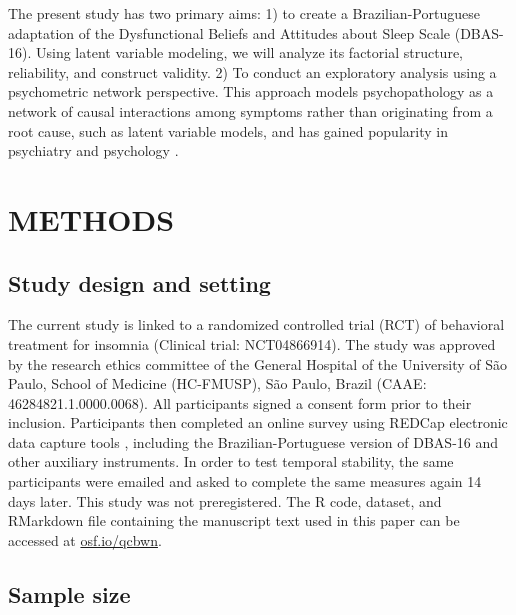 \documentclass[
  12pt,
  twoside,
  openright,
  a4paper,
  chapter=TITLE,
  section=TITLE,
  brazil]{abntex2}
\begin{document}
The present study has two primary aims: 1) to create a
Brazilian-Portuguese adaptation of the Dysfunctional Beliefs and
Attitudes about Sleep Scale (DBAS-16). Using latent variable modeling,
we will analyze its factorial structure, reliability, and construct
validity. 2) To conduct an exploratory analysis using a psychometric
network perspective. This approach models psychopathology as a network
of causal interactions among symptoms rather than originating from a
root cause, such as latent variable models, and has gained popularity in
psychiatry and psychology
\autocite{borsboom2008,borsboom2013,bringmann2022}.

\hypertarget{methods}{%
\section{METHODS}\label{methods}}

\hypertarget{study-design-and-setting}{%
\subsection{Study design and setting}\label{study-design-and-setting}}

The current study is linked to a randomized controlled trial (RCT) of
behavioral treatment for insomnia (Clinical trial: NCT04866914). The
study was approved by the research ethics committee of the General
Hospital of the University of São Paulo, School of Medicine (HC-FMUSP),
São Paulo, Brazil (CAAE: 46284821.1.0000.0068). All participants signed
a consent form prior to their inclusion. Participants then completed an
online survey using REDCap electronic data capture tools
\autocite{harris2019redcap}, including the Brazilian-Portuguese version
of DBAS-16 and other auxiliary instruments. In order to test temporal
stability, the same participants were emailed and asked to complete the
same measures again 14 days later. This study was not preregistered. The
R code, dataset, and RMarkdown file containing the manuscript text used
in this paper can be accessed at
\href{https://osf.io/qcbwn/}{osf.io/qcbwn}.

\hypertarget{sample-size}{%
\subsection{Sample size}\label{sample-size}}
\end{document}
